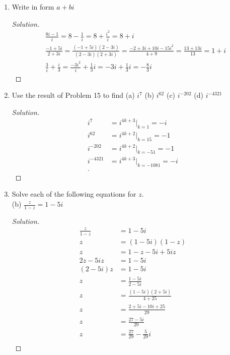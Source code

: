 
\begin{enumerate}
	\item Write in form $a+bi$
\begin{proof}[Solution]
\begin{align*}
	& \frac{8i - 1}{i }=8-\frac{1}{i }=8+\frac{ i^2 }{i }=8+i\\
	& \frac{-1+5 i}{2+3 i}
	= \frac{(-1+5 i)(2-3i)}{(2-3i)(2+3 i)}
	= \frac{-2+3i+10i-15i^2}{4+9}
	= \frac{13+13i}{13}
	= 1+i	\\
	& \frac{3}{i}+\frac{i}{3}
	= \frac{-3i^2}{i}+\frac{1}{3}i
	= -3i+\frac{1}{3}i
	= -\frac{8}{3}i
\end{align*}
\end{proof}
\item Use the result of Problem 15 to find
(a) $i^{7}$
(b) $i^{62}$
(c) $i^{-202}$
(d) $i^{-4321}$
\begin{proof}[Solution]
\begin{align*}
	i^7 &= i^{4k+3}|_{k=1} = -i\\
	i^{62} &= i^{4k+2}|_{k=15} = -1\\
	i^{-202} &= i^{4k+2}|_{k=-51} = -1\\
	i^{-4321} &= i^{4k+3}|_{k=-1081} = -i\\
.\end{align*}
\end{proof}
\item Solve each of the following equations for $z$.
\\(b) $\frac{z}{1-z}=1-5 i$
\begin{proof}[Solution]
	\begin{align*}
		\frac{z}{1-z}&=1-5 i\\
		z&=(1-5 i)(1-z)\\
		z&=1-z-5i+5iz\\
		2z-5iz&=1-5i\\
		(2-5i)z&=1-5i\\
		z&=\frac{1-5i}{2-5i}\\
		z&=\frac{(1-5i)(2+5i)}{4+25}\\
		z&=\frac{2+5i-10i+25}{29}\\
		z&=\frac{27-5i}{29}\\
		z&=\frac{27}{29} - \frac{5}{29}i\\
	\end{align*}
\end{proof}


\end{enumerate}

